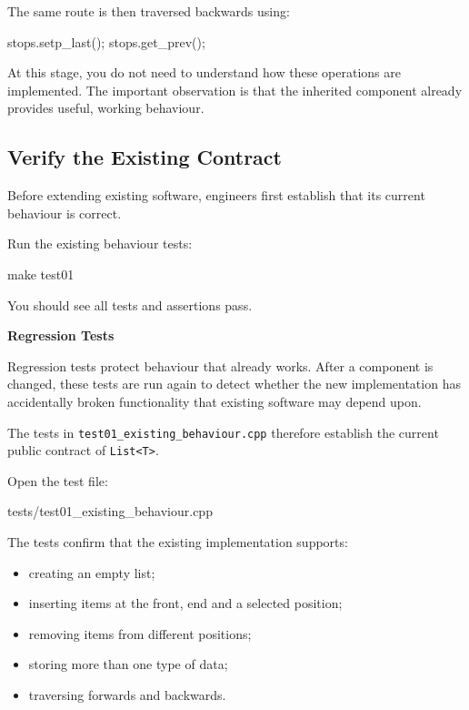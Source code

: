 \documentclass{csc2059practical}
\begin{document}
The same route is then traversed backwards using:

\begin{cppcode}
stops.setp_last();
stops.get_prev();
\end{cppcode}

At this stage, you do not need to understand how these operations are implemented. The important observation is that the inherited component already provides useful, working behaviour.


\subsection{Verify the Existing Contract}

Before extending existing software, engineers first establish that its current behaviour is correct.

Run the existing behaviour tests:

\begin{terminal}
make test01
\end{terminal}

You should see all tests and assertions pass.

\begin{infobox}
\textbf{Regression Tests}

Regression tests protect behaviour that already works. After a component is changed, these tests are run again to detect whether the new implementation has accidentally broken functionality that existing software may depend upon.

The tests in \texttt{test01_existing_behaviour.cpp} therefore establish the current public contract of \texttt{List<T>}.
\end{infobox}

Open the test file:

\begin{terminal}
tests/test01_existing_behaviour.cpp
\end{terminal}

The tests confirm that the existing implementation supports:

\begin{itemize}
    \item creating an empty list;
    \item inserting items at the front, end and a selected position;
    \item removing items from different positions;
    \item storing more than one type of data;
    \item traversing forwards and backwards.
\end{itemize}
\end{document}
